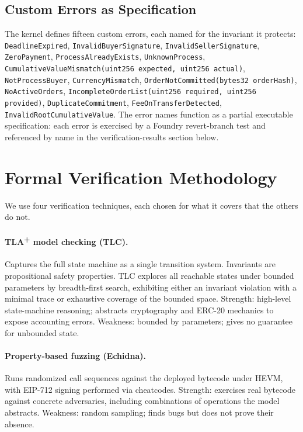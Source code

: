 \documentclass[11pt,a4paper]{article}
\theoremstyle{definition}
\theoremstyle{remark}
\begin{document}
\subsection{Custom Errors as Specification}

The kernel defines fifteen custom errors, each named for the
invariant it protects: \texttt{DeadlineExpired},
\texttt{InvalidBuyerSignature}, \texttt{InvalidSellerSignature},
\texttt{ZeroPayment}, \texttt{ProcessAlreadyExists},
\texttt{UnknownProcess}, \texttt{CumulativeValueMismatch(uint256
expected, uint256 actual)}, \texttt{NotProcessBuyer},
\texttt{CurrencyMismatch}, \texttt{OrderNotCommitted(bytes32
orderHash)}, \texttt{NoActiveOrders},
\texttt{IncompleteOrderList(uint256 required, uint256 provided)},
\texttt{DuplicateCommitment}, \texttt{FeeOnTransferDetected},
\texttt{InvalidRootCumulativeValue}.
The error names function as a partial executable specification:
each error is exercised by a Foundry revert-branch test and
referenced by name in the verification-results section below.

\section{Formal Verification Methodology}
\label{sec:verification-method}

We use four verification techniques, each chosen for what it covers
that the others do not.

\paragraph{TLA\textsuperscript{+} model checking (TLC).}
Captures the full state machine as a single transition system.
Invariants are propositional safety properties. TLC explores all
reachable states under bounded parameters by breadth-first search,
exhibiting either an invariant violation with a minimal trace or
exhaustive coverage of the bounded space. Strength: high-level
state-machine reasoning; abstracts cryptography and ERC-20 mechanics
to expose accounting errors. Weakness: bounded by parameters; gives
no guarantee for unbounded state.

\paragraph{Property-based fuzzing (Echidna).}
Runs randomized call sequences against the deployed bytecode under
HEVM, with EIP-712 signing performed via cheatcodes. Strength:
exercises real bytecode against concrete adversaries, including
combinations of operations the model abstracts. Weakness: random
sampling; finds bugs but does not prove their absence.
\end{document}
